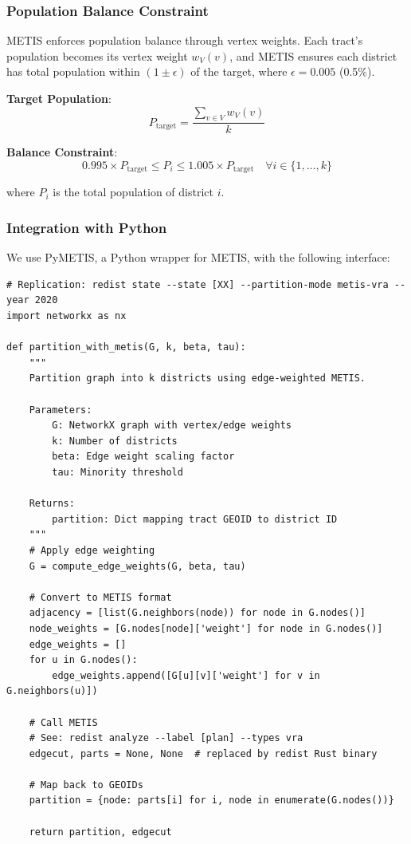 \subsubsection{Population Balance Constraint}

METIS enforces population balance through vertex weights. Each tract's population becomes its vertex weight $w_V(v)$, and METIS ensures each district has total population within $(1 \pm \epsilon)$ of the target, where $\epsilon = 0.005$ (0.5\%).

\textbf{Target Population}:
\[
P_{\text{target}} = \frac{\sum_{v \in V} w_V(v)}{k}
\]

\textbf{Balance Constraint}:
\[
0.995 \times P_{\text{target}} \leq P_i \leq 1.005 \times P_{\text{target}} \quad \forall i \in \{1, \ldots, k\}
\]

where $P_i$ is the total population of district $i$.

\subsubsection{Integration with Python}

We use PyMETIS, a Python wrapper for METIS, with the following interface:

\begin{verbatim}
# Replication: redist state --state [XX] --partition-mode metis-vra --year 2020
import networkx as nx

def partition_with_metis(G, k, beta, tau):
    """
    Partition graph into k districts using edge-weighted METIS.

    Parameters:
        G: NetworkX graph with vertex/edge weights
        k: Number of districts
        beta: Edge weight scaling factor
        tau: Minority threshold

    Returns:
        partition: Dict mapping tract GEOID to district ID
    """
    # Apply edge weighting
    G = compute_edge_weights(G, beta, tau)

    # Convert to METIS format
    adjacency = [list(G.neighbors(node)) for node in G.nodes()]
    node_weights = [G.nodes[node]['weight'] for node in G.nodes()]
    edge_weights = []
    for u in G.nodes():
        edge_weights.append([G[u][v]['weight'] for v in G.neighbors(u)])

    # Call METIS
    # See: redist analyze --label [plan] --types vra
    edgecut, parts = None, None  # replaced by redist Rust binary

    # Map back to GEOIDs
    partition = {node: parts[i] for i, node in enumerate(G.nodes())}

    return partition, edgecut
\end{verbatim}

